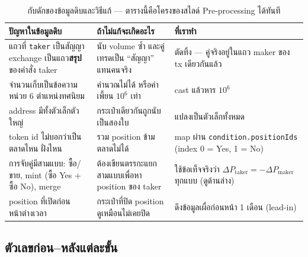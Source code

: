 \documentclass[11pt,a4paper]{article}
\newcommand{\sansall}{\sffamily}
\newcommand{\code}[1]{\texttt{#1}}
\newcommand{\thd}[1]{\sansall\bfseries #1}
\begin{document}
\begin{table}[H]
\centering\small
\begin{tabular}{L{4.4cm}L{5.0cm}L{5.0cm}}
\toprule
\thd{ปัญหาในข้อมูลดิบ} & \thd{ถ้าไม่แก้จะเกิดอะไร} & \thd{ที่เราทำ} \\
\midrule
แถวที่ \code{taker} เป็นสัญญา exchange เป็นแถว\textbf{สรุป}ของคำสั่ง taker &
  นับ volume ซ้ำ และคู่เทรดเป็น ``สัญญา'' แทนคนจริง &
  ตัดทิ้ง --- คู่จริงอยู่ในแถว maker ของ tx เดียวกันแล้ว \\
\addlinespace
จำนวนเก็บเป็นข้อความ หน่วย 6 ตำแหน่งทศนิยม &
  คำนวณไม่ได้ หรือค่าเพี้ยน $10^6$ เท่า &
  cast แล้วหาร $10^6$ \\
\addlinespace
address มีทั้งตัวเล็กตัวใหญ่ &
  กระเป๋าเดียวกันถูกนับเป็นสองใบ &
  แปลงเป็นตัวเล็กทั้งหมด \\
\addlinespace
token id ไม่บอกว่าเป็นตลาดไหน ฝั่งไหน &
  รวม position ข้ามตลาดไม่ได้ &
  map ผ่าน \code{condition.positionIds} (index 0 = Yes, 1 = No) \\
\addlinespace
การจับคู่มีสามแบบ: ซื้อ/ขาย, mint (ซื้อ Yes + ซื้อ No), merge &
  ต้องเขียนตรรกะแยกสามแบบเพื่อหา position ของ taker &
  ใช้ข้อเท็จจริงว่า $\Delta P_{\text{taker}} = -\Delta P_{\text{maker}}$ ทุกแบบ (ดูด้านล่าง) \\
\addlinespace
position ที่เปิดก่อนหน้าต่างเวลา &
  กระเป๋าที่ปิด position ดูเหมือนไม่เคยปิด &
  ดึงข้อมูลเผื่อก่อนหน้า 1 เดือน (lead-in) \\
\bottomrule
\end{tabular}
\caption{กับดักของข้อมูลดิบและวิธีแก้ --- ตารางนี้คือโครงของสไลด์ Pre-processing ได้ทันที}
\end{table}

\subsection{ตัวเลขก่อน--หลังแต่ละขั้น}
\end{document}
